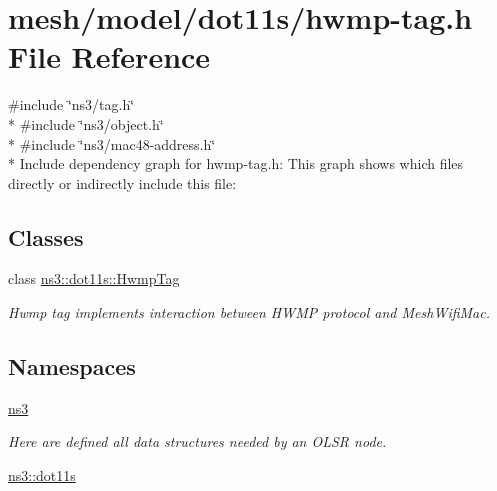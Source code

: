 \hypertarget{hwmp-tag_8h}{}\section{mesh/model/dot11s/hwmp-\/tag.h File Reference}
\label{hwmp-tag_8h}
{\ttfamily \#include \char`\"{}ns3/tag.\+h\char`\"{}}\\*
{\ttfamily \#include \char`\"{}ns3/object.\+h\char`\"{}}\\*
{\ttfamily \#include \char`\"{}ns3/mac48-\/address.\+h\char`\"{}}\\*
Include dependency graph for hwmp-\/tag.h\+:
This graph shows which files directly or indirectly include this file\+:
\subsection*{Classes}
\begin{DoxyCompactItemize}
\item 
class \hyperlink{classns3_1_1dot11s_1_1HwmpTag}{ns3\+::dot11s\+::\+Hwmp\+Tag}
\begin{DoxyCompactList}\small\item\em Hwmp tag implements interaction between H\+W\+MP protocol and Mesh\+Wifi\+Mac. \end{DoxyCompactList}\end{DoxyCompactItemize}
\subsection*{Namespaces}
\begin{DoxyCompactItemize}
\item 
 \hyperlink{namespacens3}{ns3}
\begin{DoxyCompactList}\small\item\em Here are defined all data structures needed by an O\+L\+SR node. \end{DoxyCompactList}\item 
 \hyperlink{namespacens3_1_1dot11s}{ns3\+::dot11s}
\end{DoxyCompactItemize}

